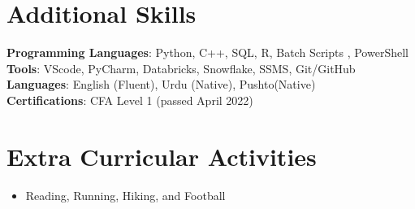 \documentclass[letterpaper,11pt]{article}
\begin{document}
\section{Additional Skills}
{
    \begin{adjustwidth}{2.5cm}{0cm} %
     \small{\textbf{Programming Languages}{: Python, C++, SQL, R, Batch Scripts , PowerShell}} \\
     \vspace{2pt}
     \small{\textbf{Tools}{: VScode, PyCharm, Databricks, Snowflake, SSMS, Git/GitHub}}\\
     \vspace{2pt}
     \small{\textbf{Languages}{: English (Fluent), Urdu (Native), Pushto(Native)}}\\
     \vspace{2pt}
     \small{\textbf{Certifications}{: CFA Level 1 (passed April 2022)}
    }
    \end{adjustwidth}
}
    

\section{Extra Curricular Activities}
{
    \begin{adjustwidth}{2.5cm}{0cm} %
    \begin{itemize}
        \item Reading, Running, Hiking, and Football
    \end{itemize}
    \end{adjustwidth}
}
\end{document}
